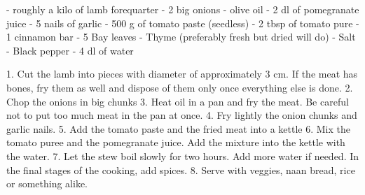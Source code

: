 
%
%


- roughly a kilo of lamb forequarter
- 2 big onions
- olive oil
- 2 dl of pomegranate juice
- 5 nails of garlic
- 500 g of tomato paste (seedless)
- 2 tbsp of tomato pure
- 1 cinnamon bar
- 5 Bay leaves
- Thyme (preferably fresh but dried will do)
- Salt
- Black pepper
- 4 dl of water

1. Cut the lamb into pieces with diameter of approximately 3 cm. If the meat has bones, fry them as well and dispose of them only once everything else is done.
2. Chop the onions in big chunks
3. Heat oil in a pan and fry the meat. Be careful not to put too much meat in the pan at once.
4. Fry lightly the onion chunks and garlic nails.
5. Add the tomato paste and the fried meat into a kettle
6. Mix the tomato puree and the pomegranate juice. Add the mixture into the kettle with the water.
7. Let the stew boil slowly for two hours. Add more water if needed. In the final stages of the cooking, add spices.
8. Serve with veggies, naan bread, rice or something alike.

